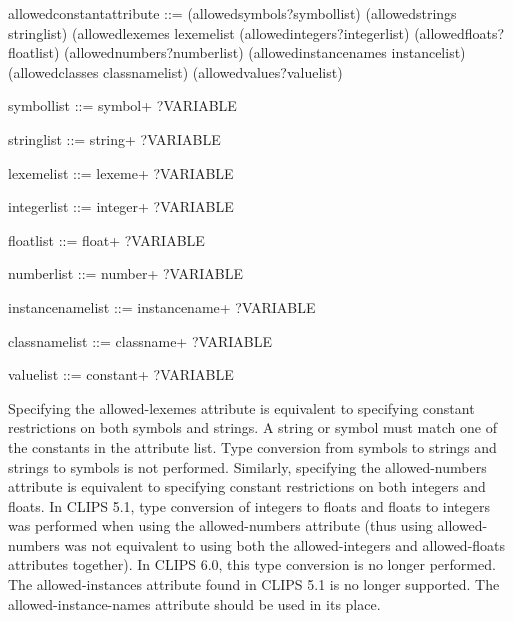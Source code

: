 \documentclass[letterpaper,10pt,english]{sphinxmanual}
\begin{document}
\begin{sphinxVerbatim}[commandchars=\\\{\}]
\PYGZlt{}allowed\PYGZhy{}constant\PYGZhy{}attribute\PYGZgt{} ::= (allowed\PYGZhy{}symbols?\PYGZlt{}symbol\PYGZhy{}list\PYGZgt{}) \textbar{}
  (allowed\PYGZhy{}strings \PYGZlt{}string\PYGZhy{}list\PYGZgt{}) \textbar{}
  (allowed\PYGZhy{}lexemes \PYGZlt{}lexeme\PYGZhy{}list\PYGZgt{} \textbar{}
  (allowed\PYGZhy{}integers?\PYGZlt{}integer\PYGZhy{}list\PYGZgt{}) \textbar{}
  (allowed\PYGZhy{}floats?\PYGZlt{}float\PYGZhy{}list\PYGZgt{}) \textbar{}
  (allowed\PYGZhy{}numbers?\PYGZlt{}number\PYGZhy{}list\PYGZgt{}) \textbar{}
  (allowed\PYGZhy{}instance\PYGZhy{}names \PYGZlt{}instance\PYGZhy{}list\PYGZgt{}) \textbar{}
  (allowed\PYGZhy{}classes \PYGZlt{}class\PYGZhy{}name\PYGZhy{}list\PYGZgt{})
  (allowed\PYGZhy{}values?\PYGZlt{}value\PYGZhy{}list\PYGZgt{})


  \PYGZlt{}symbol\PYGZhy{}list\PYGZgt{} ::= \PYGZlt{}symbol\PYGZgt{}+ \textbar{} ?VARIABLE

  \PYGZlt{}string\PYGZhy{}list\PYGZgt{} ::= \PYGZlt{}string\PYGZgt{}+ \textbar{} ?VARIABLE

  \PYGZlt{}lexeme\PYGZhy{}list\PYGZgt{} ::= \PYGZlt{}lexeme\PYGZgt{}+ \textbar{} ?VARIABLE

  \PYGZlt{}integer\PYGZhy{}list\PYGZgt{} ::= \PYGZlt{}integer\PYGZgt{}+ \textbar{} ?VARIABLE

  \PYGZlt{}float\PYGZhy{}list\PYGZgt{} ::= \PYGZlt{}float\PYGZgt{}+ \textbar{} ?VARIABLE

  \PYGZlt{}number\PYGZhy{}list\PYGZgt{} ::= \PYGZlt{}number\PYGZgt{}+ \textbar{} ?VARIABLE

  \PYGZlt{}instance\PYGZhy{}name\PYGZhy{}list\PYGZgt{} ::= \PYGZlt{}instance\PYGZhy{}name\PYGZgt{}+ \textbar{} ?VARIABLE

  \PYGZlt{}class\PYGZhy{}name\PYGZhy{}list\PYGZgt{} ::= \PYGZlt{}class\PYGZhy{}name\PYGZgt{}+ \textbar{} ?VARIABLE

  \PYGZlt{}value\PYGZhy{}list\PYGZgt{} ::= \PYGZlt{}constant\PYGZgt{}+ \textbar{} ?VARIABLE
\end{sphinxVerbatim}

Specifying the allowed-lexemes attribute is equivalent to specifying
constant restrictions on both symbols and strings. A string or symbol
must match one of the constants in the attribute list. Type conversion
from symbols to strings and strings to symbols is not performed.
Similarly, specifying the allowed-numbers attribute is equivalent to
specifying constant restrictions on both integers and floats. In CLIPS
5.1, type conversion of integers to floats and floats to integers was
performed when using the allowed-numbers attribute (thus using
allowed-numbers was not equivalent to using both the allowed-integers
and allowed-floats attributes together). In CLIPS 6.0, this type
conversion is no longer performed. The allowed-instances attribute found
in CLIPS 5.1 is no longer supported. The allowed-instance-names
attribute should be used in its place.
\end{document}
